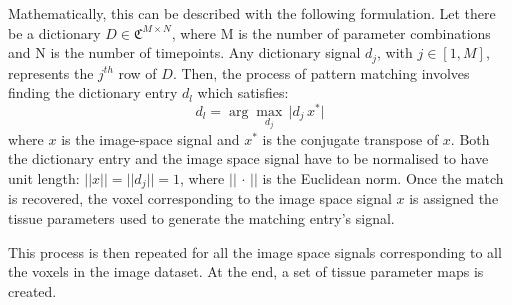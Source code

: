\hfill

Mathematically, this can be described with the following formulation.
Let there be a dictionary $D \in \mathfrak{C}^{M \times N}$, where M is the number of parameter combinations and N is the number of timepoints.
Any dictionary signal $d_j$, with $j \in [1,M]$, represents the $j^{th}$ row of $D$.
Then, the process of pattern matching involves finding the dictionary entry $d_l$ which satisfies:
\begin{equation}
    d_l = \arg\!\max_{d_j} \, \lvert d_j \, x^* \rvert
\end{equation}
where $x$ is the image-space signal and $x^*$ is the conjugate transpose of $x$.
Both the dictionary entry and the image space signal have to be normalised to have unit length: $\lvert \lvert x \rvert \rvert = \lvert \lvert d_j \rvert \rvert = 1$, where $\lvert \lvert \, \cdot \, \rvert \rvert$ is the Euclidean norm.
Once the match is recovered, the voxel corresponding to the image space signal $x$ is assigned the tissue parameters used to generate the matching entry's signal.

\hfill

This process is then repeated for all the image space signals corresponding to all the voxels in the image dataset.
At the end, a set of tissue parameter maps is created.